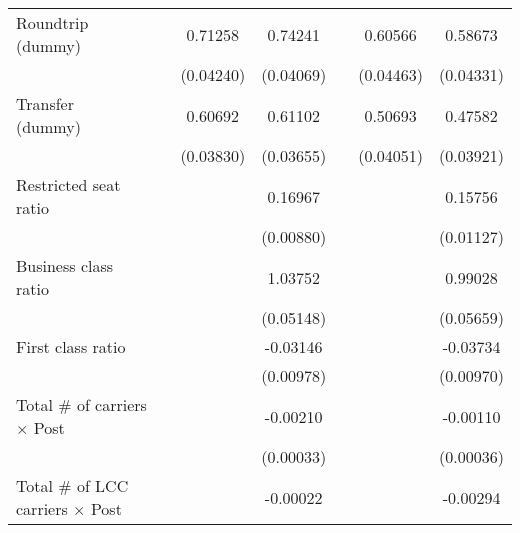 \begin{table}[htbp]
\begin{tabular}{l*{6}{c}}
\addlinespace
\shortstack{Roundtrip \\ (dummy)}&                     &     0.71258\sym{***}&     0.74241\sym{***}&                     &     0.60566\sym{***}&     0.58673\sym{***}\\
                    &                     &   (0.04240)         &   (0.04069)         &                     &   (0.04463)         &   (0.04331)         \\
\addlinespace
\shortstack{Transfer \\ (dummy)}&                     &     0.60692\sym{***}&     0.61102\sym{***}&                     &     0.50693\sym{***}&     0.47582\sym{***}\\
                    &                     &   (0.03830)         &   (0.03655)         &                     &   (0.04051)         &   (0.03921)         \\
\addlinespace
Restricted seat ratio&                     &                     &     0.16967\sym{***}&                     &                     &     0.15756\sym{***}\\
                    &                     &                     &   (0.00880)         &                     &                     &   (0.01127)         \\
\addlinespace
Business class ratio&                     &                     &     1.03752\sym{***}&                     &                     &     0.99028\sym{***}\\
                    &                     &                     &   (0.05148)         &                     &                     &   (0.05659)         \\
\addlinespace
First class ratio   &                     &                     &    -0.03146\sym{***}&                     &                     &    -0.03734\sym{***}\\
                    &                     &                     &   (0.00978)         &                     &                     &   (0.00970)         \\
\addlinespace
Total # of carriers $\times$ Post&                     &                     &    -0.00210\sym{***}&                     &                     &    -0.00110\sym{***}\\
                    &                     &                     &   (0.00033)         &                     &                     &   (0.00036)         \\
\addlinespace
Total # of LCC carriers $\times$ Post&                     &                     &    -0.00022         &                     &                     &    -0.00294\sym{**} \\

\end{tabular}
\end{table}
